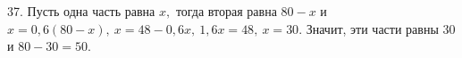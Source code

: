 37. Пусть одна часть равна $x,$ тогда вторая равна $80-x$ и $x=0,6(80-x),\ x=48-0,6x,\ 1,6x=48,\ x=30.$ Значит, эти части равны 30 и $80-30=50.$\\
